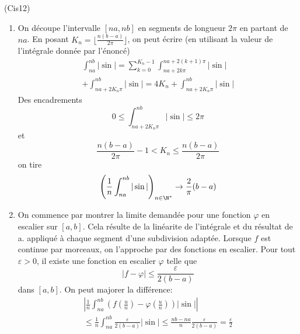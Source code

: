 \begin{tiny}(Cis12)\end{tiny}
\begin{enumerate}
 \item On découpe l'intervalle $[na,nb]$ en segments de longueur $2\pi$ en partant de $na$. En posant $K_n=\lfloor\frac{n(b-a)}{2\pi} \rfloor$, on peut écrire (en utilisant la valeur de l'intégrale donnée par l'énoncé)
\begin{multline*}
 \int_{na}^{nb}|\sin| 
= \sum_{k=0}^{K_n-1}\int_{na+2k\pi}^{na+2(k+1)\pi}|\sin| \\ + \int_{na+2K_n\pi}^{nb}|\sin|
= 4K_n + \int_{na+2K_n\pi}^{nb}|\sin|
\end{multline*}
Des encadrements
\begin{displaymath}
 0\leq \int_{na+2K_n\pi}^{nb}|\sin| \leq 2\pi
\end{displaymath}
et 
\begin{displaymath}
 \frac{n(b-a)}{2\pi}-1 < K_n \leq \frac{n(b-a)}{2\pi}
\end{displaymath}
on tire
\begin{displaymath}
 \left(\frac{1}{n}\int_{na}^{nb}|\sin | \right)_{n\in\N^*} \rightarrow \frac{2}{\pi}(b-a)
\end{displaymath}
\item On commence par montrer la limite demandée pour une fonction $\varphi$ en escalier sur $[a,b]$. Cela résulte de la linéarite de l'intégrale et du résultat de a. appliqué à chaque segment d'une subdivision adaptée.\newline
Lorsque $f$ est continue par morceaux, on l'approche par des fonctions en escalier. Pour tout $\varepsilon >0$, il existe une fonction en escalier $\varphi$ telle que 
\begin{displaymath}
|f-\varphi|\leq \frac{\varepsilon}{2(b-a)} 
\end{displaymath}
dans $[a,b]$. On peut majorer la différence:
\begin{multline*}
 \left\vert\frac{1}{n}\int_{na}^{nb}(f(\frac{u}{n})-\varphi(\frac{u}{n}))|\sin | \right\vert\\
\leq \frac{1}{n}\int_{na}^{nb}\frac{\varepsilon}{2(b-a)}|\sin |\leq \frac{nb-na}{n}\frac{\varepsilon}{2(b-a)}=\frac{\varepsilon}{2}
\end{multline*}

\end{enumerate}
